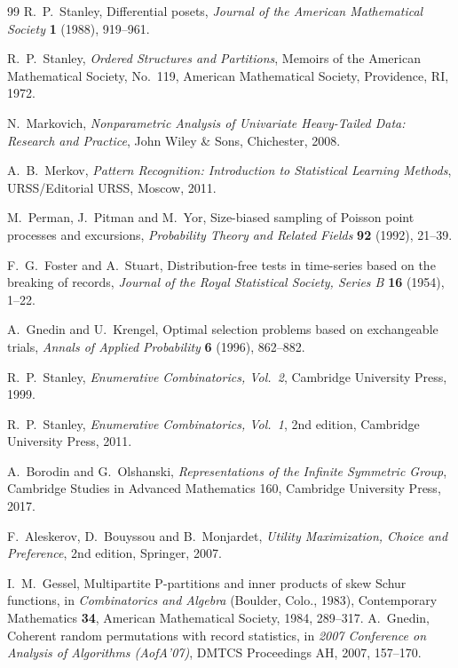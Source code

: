 \documentclass[11pt]{article}
\theoremstyle{plain}
\theoremstyle{definition}
\begin{document}
\begin{thebibliography}{99}
 R.~P.~Stanley, Differential posets, \emph{Journal of the American Mathematical Society} \textbf{1} (1988), 919--961.

 R.~P.~Stanley, \emph{Ordered Structures and Partitions}, Memoirs of the American Mathematical Society, No.~119, American Mathematical Society, Providence, RI, 1972.

 N.~Markovich, \emph{Nonparametric Analysis of Univariate Heavy-Tailed Data: Research and Practice}, John Wiley \& Sons, Chichester, 2008.

 A.~B.~Merkov, \emph{Pattern Recognition: Introduction to Statistical Learning Methods}, URSS/Editorial URSS, Moscow, 2011.

 M.~Perman, J.~Pitman and M.~Yor, Size-biased sampling of Poisson point processes and excursions, \emph{Probability Theory and Related Fields} \textbf{92} (1992), 21--39.

 F.~G.~Foster and A.~Stuart, Distribution-free tests in time-series based on the breaking of records, \emph{Journal of the Royal Statistical Society, Series B} \textbf{16} (1954), 1--22.

 A.~Gnedin and U.~Krengel, Optimal selection problems based on exchangeable trials, \emph{Annals of Applied Probability} \textbf{6} (1996), 862--882.

 R.~P.~Stanley, \emph{Enumerative Combinatorics, Vol.~2}, Cambridge University Press, 1999.

 R.~P.~Stanley, \emph{Enumerative Combinatorics, Vol.~1}, 2nd edition, Cambridge University Press, 2011.

 A.~Borodin and G.~Olshanski, \emph{Representations of the Infinite Symmetric Group}, Cambridge Studies in Advanced Mathematics 160, Cambridge University Press, 2017.

 F.~Aleskerov, D.~Bouyssou and B.~Monjardet, \emph{Utility Maximization, Choice and Preference}, 2nd edition, Springer, 2007.

 I.~M.~Gessel, Multipartite P-partitions and inner products of skew Schur functions, in \emph{Combinatorics and Algebra} (Boulder, Colo., 1983), Contemporary Mathematics \textbf{34}, American Mathematical Society, 1984, 289--317.
 A.~Gnedin, Coherent random permutations with record statistics, in \emph{2007 Conference on Analysis of Algorithms (AofA'07)}, DMTCS Proceedings AH, 2007, 157--170.



\end{thebibliography}
\end{document}
